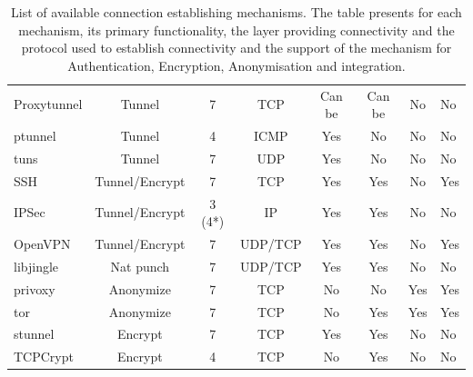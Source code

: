 \begin{table}
\begin{tabular}{|l|c|c|c|c|c|c|p{1.5cm}| }
Proxytunnel & Tunnel            & 7      & TCP         & Can be & Can be & No & No\\
ptunnel     & Tunnel            & 4      & ICMP        & Yes    & No     & No & No\\
tuns        & Tunnel            & 7      & UDP         & Yes    & No     & No & No\\
SSH         & Tunnel/Encrypt & 7      & TCP         & Yes    & Yes    & No & Yes\\
IPSec       & Tunnel/Encrypt & 3 (4*) & IP          & Yes    & Yes    & No & No\\
OpenVPN     & Tunnel/Encrypt & 7      & UDP/TCP     & Yes    & Yes    & No & Yes\\
libjingle   & Nat punch         & 7      & UDP/TCP     & Yes    & Yes & No & No\\
privoxy     & Anonymize         & 7      & TCP         & No    & No   & Yes & Yes\\
tor         & Anonymize         & 7      & TCP         & No     & Yes & Yes & Yes\\
stunnel     & Encrypt        & 7      & TCP         & Yes    & Yes    & No & No\\
TCPCrypt    & Encrypt        & 4      & TCP         & No     & Yes    & No & No\\
\hline
\end{tabular}
\caption[List of available connection-establishing
mechanisms.]{\label{tbl:signpost-tunnels}List of available connection
  establishing mechanisms. The table presents for each mechanism, its primary
  functionality, the layer providing connectivity and the protocol used to
  establish connectivity and the support of the mechanism for Authentication,
  Encryption, Anonymisation and \signpost integration.}
\end{table}

